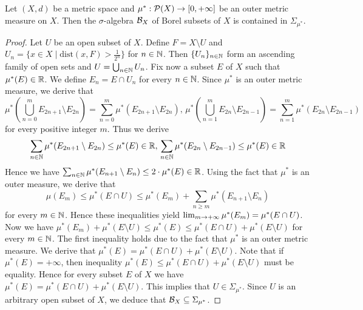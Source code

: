 \begin{theorem}
Let $(X,d)$ be a metric space and $\mu^*:{\mathcal P}(X)\rightarrow [0,+\infty]$ be an outer metric measure on $X$. Then the $\sigma$-algebra ${\mathcal B}_X$ of Borel subsets of $X$ is contained in $\Sigma_{\mu^*}$.
\end{theorem}
\begin{proof}
Let $U$ be an open subset of $X$. Define $F=X\setminus U$ and $U_n=\{x\in X\mid \mathrm{dist}(x,F)>\frac{1}{2^n}\}$ for $n\in {\mathbb N}$. Then $\{U_n\}_{n\in {\mathbb N}}$ form an ascending family of open sets and $U=\bigcup_{n\in {\mathbb N}}U_n$. Fix now a subset $E$ of $X$ such that $\mu^*(E)\in {\mathbb R}$. We define $E_n=E\cap U_n$ for every $n\in {\mathbb N}$. Since $\mu^*$ is an outer metric measure, we derive that
$$\mu^*\left(\bigcup_{n=0}^mE_{2n+1}\setminus E_{2n}\right)=\sum_{n=0}^m\mu^*(E_{2n+1}\setminus E_{2n}),\,\mu^*\left(\bigcup_{n=1}^mE_{2n}\setminus E_{2n-1}\right)=\sum_{n=1}^m\mu^*(E_{2n}\setminus E_{2n-1})$$
for every positive integer $m$. Thus we derive 
$$\sum_{n\in {\mathbb N}}\mu^*(E_{2n+1}\setminus E_{2n})\leq \mu^*(E)\in {\mathbb R},\,\sum_{n\in {\mathbb N}}\mu^*(E_{2n}\setminus E_{2n-1})\leq \mu^*(E)\in {\mathbb R}$$
Hence we have $\sum_{n\in {\mathbb N}}\mu^*(E_{n+1}\setminus E_{n})\leq 2\cdot \mu^*(E)\in {\mathbb R}$. Using the fact that $\mu^*$ is an outer measure, we derive that
$$\mu(E_m)\leq \mu^*(E\cap U)\leq \mu^*(E_m)+\sum_{n\geq m}\mu^*(E_{n+1}\setminus E_n)$$
for every $m\in {\mathbb N}$. Hence these inequalities yield $\lim_{m\rightarrow +\infty}\mu^*(E_m)=\mu^*(E\cap U)$. Now we have $\mu^*(E_m)+\mu^*(E\setminus U)\leq \mu^*(E)\leq \mu^*(E\cap U)+\mu^*(E\setminus U)$ for every $m\in {\mathbb N}$. The first inequality holds due to the fact that $\mu^*$ is an outer metric measure. We derive that $\mu^*(E)=\mu^*(E\cap U)+\mu^*(E\setminus U)$. Note that if $\mu^*(E)=+\infty$, then inequality $\mu^*(E)\leq \mu^*(E\cap U)+\mu^*(E\setminus U)$ must be equality. Hence for every subset $E$ of $X$ we have $\mu^*(E)=\mu^*(E\cap U)+\mu^*(E\setminus U)$. This implies that $U\in \Sigma_{\mu^*}$. Since $U$ is an arbitrary open subset of $X$, we deduce that ${\mathcal B}_X\subseteq \Sigma_{\mu^*}$.
\end{proof}































































